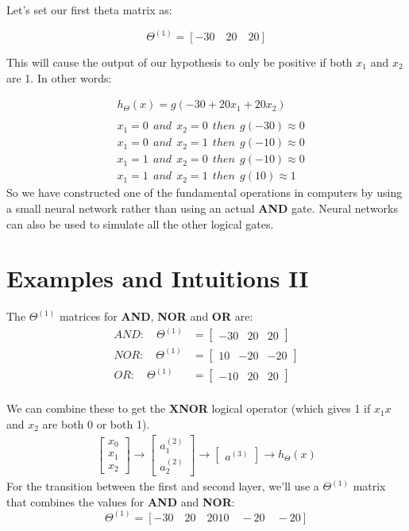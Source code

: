 Let's set our first theta matrix as:

\begin{equation*}
\Theta^{(1)} = [-30\quad20\quad20]
\end{equation*}

This will cause the output of our hypothesis to only be positive if both $x_1$ and $x_2$ are 1. In other words:

\begin{align*}
& h_\Theta(x) = g(-30 + 20x_1 + 20x_2) \\ \\ 
& x_1 = 0 \ \ and \ \ x_2 = 0 \ \ then \ \ g(-30) \approx 0 \\ 
& x_1 = 0 \ \ and \ \ x_2 = 1 \ \ then \ \ g(-10) \approx 0 \\
& x_1 = 1 \ \ and \ \ x_2 = 0 \ \ then \ \ g(-10) \approx 0 \\ 
& x_1 = 1 \ \ and \ \ x_2 = 1 \ \ then \ \ g(10) \approx 1
\end{align*}
So we have constructed one of the fundamental operations in computers by using a small neural network rather than using an actual \textbf{AND} gate. Neural networks can also be used to simulate all the other logical gates.
\section{Examples and Intuitions II}
The $\Theta^{(1)}$ matrices for \textbf{AND}, \textbf{NOR} and \textbf{OR} are:
\begin{align*}
AND:\quad \Theta^{(1)} &= \begin{bmatrix}-30 & 20 & 20\end{bmatrix} \\ 
NOR:\quad \Theta^{(1)} &= \begin{bmatrix}10 & -20 & -20\end{bmatrix} \\
OR:\quad\Theta^{(1)} &= \begin{bmatrix}-10 & 20 & 20\end{bmatrix} \\
\end{align*}

We can combine these to get the \textbf{XNOR} logical operator (which gives 1 if $x_1x$ and $x_2$ are both 0 or both 1).
\begin{align*}
\begin{bmatrix}x_0 \\ 
x_1 \\ 
x_2
\end{bmatrix} 
\rightarrow
\begin{bmatrix}
a_1^{(2)} \\ 
a_2^{(2)} 
\end{bmatrix} 
\rightarrow
\begin{bmatrix}
a^{(3)}
\end{bmatrix} 
\rightarrow 
h_\Theta(x)
\end{align*}
For the transition between the first and second layer, we'll use a $\Theta^{(1)}$ matrix that combines the values for \textbf{AND} and \textbf{NOR}:
\begin{equation*}
\Theta^{(1)} = [-30\quad 20 \quad 2010 \quad -20 \quad -20]
\end{equation*}

